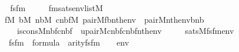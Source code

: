 \begin{isabellebody}
%
\isadelimproof
%
\endisadelimproof
%
\isatagproof
{}\isamarkupfalse%
\ {\isacharminus}{\kern0pt}\isanewline
\ \ \isamarkupfalse%
\ fsfm\ \isanewline
\ \ \ \ fmsats{\isacharcolon}{\kern0pt}{\isachardoublequoteopen}env{\isasymin}list{\isacharparenleft}{\kern0pt}M{\isacharparenright}{\kern0pt}\ {\isasymLongrightarrow}\isanewline
\ \ \ \ {\isacharparenleft}{\kern0pt}{\isasymexists}f{\isasymin}M{\isachardot}{\kern0pt}\ {\isasymexists}b{\isasymin}M{\isachardot}{\kern0pt}\ {\isasymexists}nb{\isasymin}M{\isachardot}{\kern0pt}\ {\isasymexists}cnbf{\isasymin}M{\isachardot}{\kern0pt}\ pair{\isacharparenleft}{\kern0pt}{\isacharhash}{\kern0pt}{\isacharhash}{\kern0pt}M{\isacharcomma}{\kern0pt}f{\isacharcomma}{\kern0pt}b{\isacharcomma}{\kern0pt}nth{\isacharparenleft}{\kern0pt}{}{\isacharcomma}{\kern0pt}env{\isacharparenright}{\kern0pt}{\isacharparenright}{\kern0pt}\ {\isacharampersand}{\kern0pt}\ pair{\isacharparenleft}{\kern0pt}{\isacharhash}{\kern0pt}{\isacharhash}{\kern0pt}M{\isacharcomma}{\kern0pt}nth{\isacharparenleft}{\kern0pt}{}{\isacharcomma}{\kern0pt}env{\isacharparenright}{\kern0pt}{\isacharcomma}{\kern0pt}b{\isacharcomma}{\kern0pt}nb{\isacharparenright}{\kern0pt}\isanewline
\ \ \ \ \ \ {\isacharampersand}{\kern0pt}\ is{\isacharunderscore}{\kern0pt}cons{\isacharparenleft}{\kern0pt}{\isacharhash}{\kern0pt}{\isacharhash}{\kern0pt}M{\isacharcomma}{\kern0pt}nb{\isacharcomma}{\kern0pt}f{\isacharcomma}{\kern0pt}cnbf{\isacharparenright}{\kern0pt}\ {\isacharampersand}{\kern0pt}\ upair{\isacharparenleft}{\kern0pt}{\isacharhash}{\kern0pt}{\isacharhash}{\kern0pt}M{\isacharcomma}{\kern0pt}cnbf{\isacharcomma}{\kern0pt}cnbf{\isacharcomma}{\kern0pt}nth{\isacharparenleft}{\kern0pt}{}{\isacharcomma}{\kern0pt}env{\isacharparenright}{\kern0pt}{\isacharparenright}{\kern0pt}{\isacharparenright}{\kern0pt}\isanewline
\ \ \ \ {\isasymlongleftrightarrow}\ sats{\isacharparenleft}{\kern0pt}M{\isacharcomma}{\kern0pt}fsfm{\isacharparenleft}{\kern0pt}{}{\isacharcomma}{\kern0pt}{}{\isacharcomma}{\kern0pt}{}{\isacharparenright}{\kern0pt}{\isacharcomma}{\kern0pt}env{\isacharparenright}{\kern0pt}{\isachardoublequoteclose}\isanewline
\ \ \ \ \ {\isachardoublequoteopen}fsfm{\isacharparenleft}{\kern0pt}{}{\isacharcomma}{\kern0pt}{}{\isacharcomma}{\kern0pt}{}{\isacharparenright}{\kern0pt}\ {\isasymin}\ formula{\isachardoublequoteclose}\ \ {\isachardoublequoteopen}arity{\isacharparenleft}{\kern0pt}fsfm{\isacharparenleft}{\kern0pt}{}{\isacharcomma}{\kern0pt}{}{\isacharcomma}{\kern0pt}{}{\isacharparenright}{\kern0pt}{\isacharparenright}{\kern0pt}\ {\isacharequal}{\kern0pt}\ {}{\isachardoublequoteclose}\ \ env\isanewline

\end{isabellebody}
